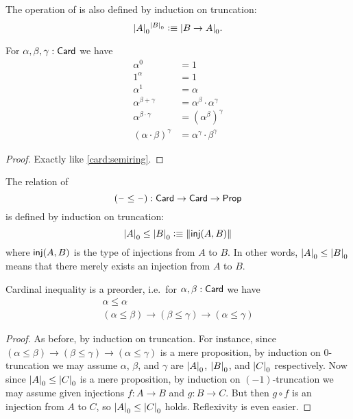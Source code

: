 \begin{defn}
  The operation of  is also defined by induction on truncation:
  \[ \mathopen{}\left|A\right|_{0}^{}\mathclose{}^{\mathopen{}\left|B\right|_{0}^{}\mathclose{}} \vcentcolon\equiv \mathopen{}\left|B\to A\right|_{0}^{}\mathclose{}. \]
\end{defn}

\begin{lem}\label{card:exp}
  For $\alpha,\beta,\gamma:\mathsf{Card}$ we have
  \begin{align*}
    \alpha^0 &= 1\\
    1^\alpha &= 1\\
    \alpha^1 &= \alpha\\
    \alpha^{\beta+\gamma} &= \alpha^\beta \cdot \alpha^\gamma\\
    \alpha^{\beta\cdot \gamma} &= (\alpha^{\beta})^\gamma\\
    (\alpha\cdot\beta)^\gamma &= \alpha^\gamma \cdot \beta^\gamma
  \end{align*}
\end{lem}
\begin{proof}
  Exactly like \cref{card:semiring}.
\end{proof}

\begin{defn}
  The relation of 
  \[ (\mathord{\hspace{1pt}\text{--}\hspace{1pt}}\le\mathord{\hspace{1pt}\text{--}\hspace{1pt}}) : \mathsf{Card}\to\mathsf{Card}\to\mathsf{Prop} \]
  is defined by induction on truncation:
  \[ \mathopen{}\left|A\right|_{0}^{}\mathclose{} \le \mathopen{}\left|B\right|_{0}^{}\mathclose{} \vcentcolon\equiv \mathopen{}\left\Vert \mathsf{inj}(A,B)\right\Vert_{}\mathclose{} \]
  where $\mathsf{inj}(A,B)$ is the type of injections from $A$ to $B$.
  In other words, $\mathopen{}\left|A\right|_{0}^{}\mathclose{} \le \mathopen{}\left|B\right|_{0}^{}\mathclose{}$ means that there merely exists an injection from $A$ to $B$.
\end{defn}

\begin{lem}
  Cardinal inequality is a preorder, i.e.\ for $\alpha,\beta:\mathsf{Card}$ we have
  \begin{gather*}
    \alpha \le \alpha\\
    (\alpha \le \beta) \to (\beta\le\gamma) \to (\alpha\le\gamma)
  \end{gather*}
\end{lem}
\begin{proof}
  As before, by induction on truncation.
  For instance, since $(\alpha \le \beta) \to (\beta\le\gamma) \to (\alpha\le\gamma)$ is a mere proposition, by induction on 0-truncation we may assume $\alpha$, $\beta$, and $\gamma$ are $\mathopen{}\left|A\right|_{0}^{}\mathclose{}$, $\mathopen{}\left|B\right|_{0}^{}\mathclose{}$, and $\mathopen{}\left|C\right|_{0}^{}\mathclose{}$ respectively.
  Now since $\mathopen{}\left|A\right|_{0}^{}\mathclose{} \le \mathopen{}\left|C\right|_{0}^{}\mathclose{}$ is a mere proposition, by induction on $(-1)$-truncation we may assume given injections $f:A\to B$ and $g:B\to C$.
  But then $g\circ f$ is an injection from $A$ to $C$, so $\mathopen{}\left|A\right|_{0}^{}\mathclose{} \le \mathopen{}\left|C\right|_{0}^{}\mathclose{}$ holds.
  Reflexivity is even easier.
\end{proof}

